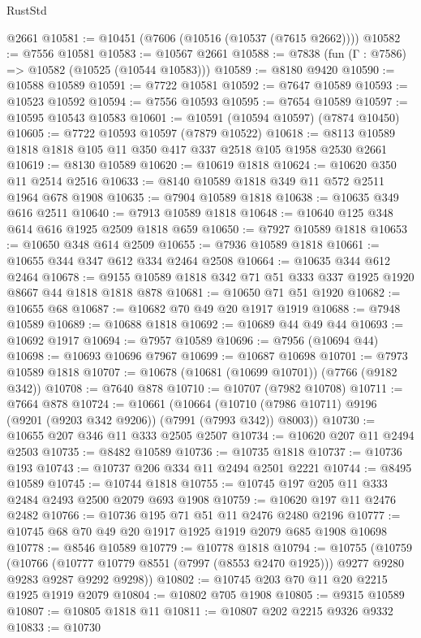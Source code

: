 \begin{lexlean}{RustStd}
\begin{coremodule}
    @2661
@10581 := @10451 (@7606 (@10516 (@10537 (@7615 @2662))))
@10582 := @7556 @10581
@10583 := @10567 @2661
@10588 := @7838 (fun (Γ : @7586) => @10582 (@10525 (@10544 @10583)))
@10589 := @8180 @9420
@10590 := @10588 @10589
@10591 := @7722 @10581
@10592 := @7647 @10589
@10593 := @10523 @10592
@10594 := @7556 @10593
@10595 := @7654 @10589
@10597 := @10595 @10543 @10583
@10601 := @10591 (@10594 @10597) (@7874 @10450)
@10605 := @7722 @10593 @10597 (@7879 @10522)
@10618 := @8113 @10589 @1818 @1818 @105 @11 @350 @417 @337 @2518 @105 @1958 @2530 @2661
@10619 := @8130 @10589
@10620 := @10619 @1818
@10624 := @10620 @350 @11 @2514 @2516
@10633 := @8140 @10589 @1818 @349 @11 @572 @2511 @1964 @678 @1908
@10635 := @7904 @10589 @1818
@10638 := @10635 @349 @616 @2511
@10640 := @7913 @10589 @1818
@10648 := @10640 @125 @348 @614 @616 @1925 @2509 @1818 @659
@10650 := @7927 @10589 @1818
@10653 := @10650 @348 @614 @2509
@10655 := @7936 @10589 @1818
@10661 := @10655 @344 @347 @612 @334 @2464 @2508
@10664 := @10635 @344 @612 @2464
@10678 := @9155 @10589 @1818 @342 @71 @51 @333 @337 @1925 @1920 @8667 @44 @1818 @1818 @878
@10681 := @10650 @71 @51 @1920
@10682 := @10655 @68
@10687 := @10682 @70 @49 @20 @1917 @1919
@10688 := @7948 @10589
@10689 := @10688 @1818
@10692 := @10689 @44 @49 @44
@10693 := @10692 @1917
@10694 := @7957 @10589
@10696 := @7956 (@10694 @44)
@10698 := @10693 @10696 @7967
@10699 := @10687 @10698
@10701 := @7973 @10589 @1818
@10707 := @10678 (@10681 (@10699 @10701)) (@7766 (@9182 @342))
@10708 := @7640 @878
@10710 := @10707 (@7982 @10708)
@10711 := @7664 @878
@10724 := @10661
    (@10664 (@10710 (@7986 @10711) @9196 (@9201 (@9203 @342 @9206)) (@7991 (@7993 @342)) @8003))
@10730 := @10655 @207 @346 @11 @333 @2505 @2507
@10734 := @10620 @207 @11 @2494 @2503
@10735 := @8482 @10589
@10736 := @10735 @1818
@10737 := @10736 @193
@10743 := @10737 @206 @334 @11 @2494 @2501 @2221
@10744 := @8495 @10589
@10745 := @10744 @1818
@10755 := @10745 @197 @205 @11 @333 @2484 @2493 @2500 @2079 @693 @1908
@10759 := @10620 @197 @11 @2476 @2482
@10766 := @10736 @195 @71 @51 @11 @2476 @2480 @2196
@10777 := @10745 @68 @70 @49 @20 @1917 @1925 @1919 @2079 @685 @1908 @10698
@10778 := @8546 @10589
@10779 := @10778 @1818
@10794 := @10755
    (@10759
      (@10766
        (@10777 @10779 @8551 (@7997 (@8553 @2470 @1925)))
        @9277
        @9280
        @9283
        @9287
        @9292
        @9298))
@10802 := @10745 @203 @70 @11 @20 @2215 @1925 @1919 @2079
@10804 := @10802 @705 @1908
@10805 := @9315 @10589
@10807 := @10805 @1818 @11
@10811 := @10807 @202 @2215 @9326 @9332
@10833 := @10730

\end{coremodule}
\end{lexlean}
